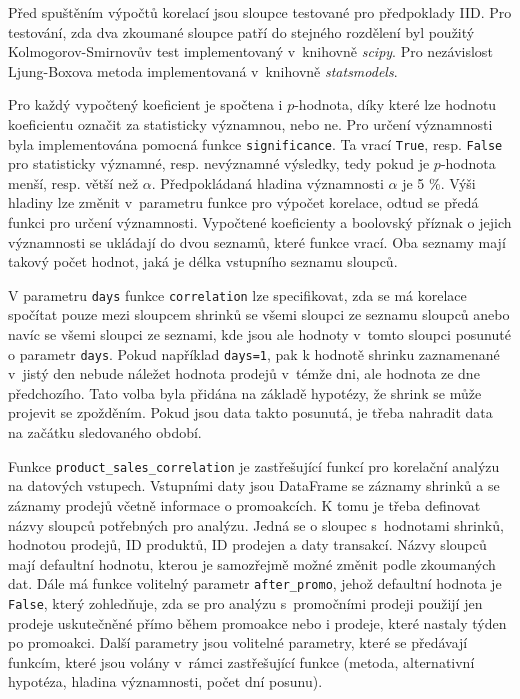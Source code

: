 Před spuštěním výpočtů korelací jsou sloupce testované pro předpoklady IID. Pro testování, zda dva zkoumané sloupce patří do stejného rozdělení byl použitý Kolmogorov-Smirnovův test implementovaný v~knihovně \emph{scipy}. Pro nezávislost Ljung-Boxova metoda implementovaná v~knihovně \emph{statsmodels}.

Pro každý vypočtený koeficient je spočtena i $p$-hodnota, díky které lze hodnotu koeficientu označit za statisticky významnou, nebo ne. Pro určení významnosti byla implementována pomocná funkce \texttt{significance}. Ta vrací \texttt{True}, resp. \texttt{False} pro statisticky významné, resp. nevýznamné výsledky, tedy pokud je $p$-hodnota menší, resp. větší než $\alpha$. Předpokládaná hladina významnosti $\alpha$ je 5 \%. Výši hladiny lze změnit v~parametru funkce pro výpočet korelace, odtud se předá funkci pro určení významnosti. Vypočtené koeficienty a boolovský příznak o jejich významnosti se ukládají do dvou seznamů, které funkce vrací. Oba seznamy mají takový počet hodnot, jaká je délka vstupního seznamu sloupců.

V parametru \texttt{days} funkce \texttt{correlation} lze specifikovat, zda se má  korelace spočítat pouze mezi sloupcem shrinků se všemi sloupci ze seznamu sloupců anebo navíc se všemi sloupci ze seznami, kde jsou ale hodnoty v~tomto sloupci posunuté o parametr \texttt{days}. Pokud například \texttt{days=1}, pak k hodnotě shrinku zaznamenané v~jistý den nebude náležet hodnota prodejů v~témže dni, ale hodnota ze dne předchozího. Tato volba byla přidána na základě hypotézy, že shrink se může projevit se zpožděním. Pokud jsou data takto posunutá, je třeba nahradit data na začátku sledovaného období. 

Funkce \texttt{product\_sales\_correlation} je zastřešující funkcí pro korelační analýzu na datových vstupech. Vstupními daty jsou DataFrame se záznamy shrinků a se záznamy prodejů včetně informace o promoakcích. K tomu je třeba definovat názvy  sloupců potřebných pro analýzu. Jedná se o sloupec s~hodnotami shrinků, hodnotou prodejů, ID produktů, ID prodejen a daty transakcí. Názvy sloupců mají defaultní hodnotu, kterou je samozřejmě možné změnit podle zkoumaných dat. Dále má funkce volitelný parametr \texttt{after\_promo}, jehož defaultní hodnota je \texttt{False}, který zohledňuje, zda se pro analýzu s~promočními prodeji použijí jen prodeje uskutečněné přímo během promoakce nebo i prodeje, které nastaly týden po promoakci. Další parametry jsou volitelné parametry, které se předávají funkcím, které jsou volány v~rámci zastřešující funkce (metoda, alternativní hypotéza, hladina významnosti, počet dní posunu). 


